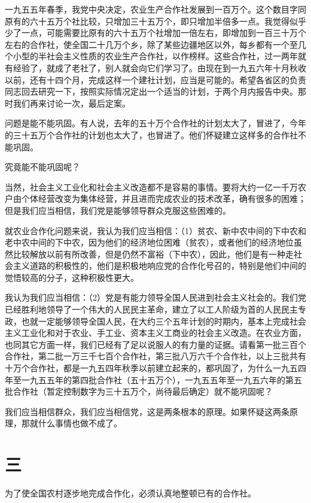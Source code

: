 一九五五年春季，我党中央决定，农业生产合作社发展到一百万个。这个数目字同原有的六十五万个社比较，只增加三十五万个，即只增加半倍多一点。我觉得似乎少了一点，可能需要比原有的六十五万个社增加一倍左右，即增加到一百三十万个左右的合作社，使全国二十几万个乡，除了某些边疆地区以外，每乡都有一个至几个小型的半社会主义性质的农业生产合作社，以作榜样。这些合作社，过一两年就有经验了，就成了老社了，别人就会向它们学习了。由现在到一九五六年十月秋收以前，还有十四个月，完成这样一个建社计划，应当是可能的。希望各省区的负责同志回去研究一下，按照实际情况定出一个适当的计划，于两个月内报告中央。那时我们再来讨论一次，最后定案。

问题是能不能巩固。有人说，去年的五十万个合作社的计划太大了，冒进了，今年的三十五万个合作社的计划也太大了，也冒进了。他们怀疑建立这样多的合作社不能巩固。

究竟能不能巩固呢？

当然，社会主义工业化和社会主义改造都不是容易的事情。要将大约一亿一千万农户由个体经营改变为集体经营，并且进而完成农业的技术改革，确有很多的困难；但是我们应当相信，我们党是能够领导群众克服这些困难的。

就农业合作化问题来说，我认为我们应当相信：（1）贫农、新中农中间的下中农和老中农中间的下中农，因为他们的经济地位困难（贫农），或者他们的经济地位虽然比较解放以前有所改善，但是仍然不富裕（下中农），因此，他们是有一种走社会主义道路的积极性的，他们是积极地响应党的合作化号召的，特别是他们中间的觉悟较高的分子，这种积极性更大。

我认为我们应当相信：（2）党是有能力领导全国人民进到社会主义社会的。我们党已经胜利地领导了一个伟大的人民民主革命，建立了以工人阶级为首的人民民主专政，也就一定能够领导全国人民，在大约三个五年计划的时期内，基本上完成社会主义工业化和对于农业、手工业、资本主义工商业的社会主义改造。在农业方面，也同其它方面一样，我们已经有了足以说服人的有力量的证据。请看第一批三百个合作社，第二批一万三千七百个合作社，第三批八万六千个合作社，以上三批共有十万个合作社，都是一九五四年秋季以前建立起来的，都巩固了，为什么一九五四年至一九五五年的第四批合作社（五十五万个），一九五五年至一九五六年的第五批合作社（暂定控制数字为三十五万个，尚待最后确定）就不能巩固呢？

我们应当相信群众，我们应当相信党，这是两条根本的原理。如果怀疑这两条原理，那就什么事情也做不成了。

\section*{三}

为了使全国农村逐步地完成合作化，必须认真地整顿已有的合作社。

